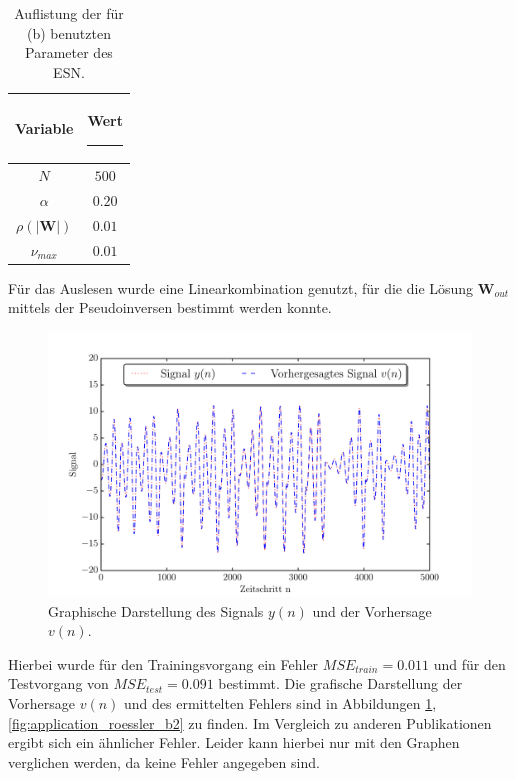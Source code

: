\begin{table}[H]
	\centering
		\begin{tabular}{|c|c|}
		\rule[-1ex]{0pt}{3.5ex} Variable & \hspace{4ex} Wert \rule[-1ex]{4ex}{0pt}\\ 
		\hline \hline 
		\rule[-1ex]{0pt}{3.5ex} $N$ & $500$ \\ 
		\hline 
		\rule[-1ex]{0pt}{3.5ex} $\alpha$ & $0.20$ \\ 
		\hline 
		\rule[-1ex]{0pt}{3.5ex} $\rho(|\mathbf{W}|)$ & $0.01$ \\
		\hline 
		\rule[-1ex]{0pt}{3.5ex} $\nu_{max}$ & $0.01$ \\ 
		\hline 
	\end{tabular} 
	\caption{Auflistung der für (b) benutzten Parameter des \textsc{ESN}.}
\label{tab:application_roessler_b}
\end{table}

Für das Auslesen wurde eine Linearkombination genutzt, für die die Lösung $\mathbf{W}_{out}$ mittels der Pseudoinversen bestimmt werden konnte.

\begin{figure}[H]
    \centering
     \includegraphics[width = 0.9 \textwidth]{figures/roessler_cross_pred.pdf}
    \caption{Graphische Darstellung des Signals $y(n)$ und der Vorhersage $v(n)$.}
    \label{fig:application_roessler_b1}
\end{figure}

Hierbei wurde für den Trainingsvorgang ein Fehler $MSE_{train} = 0.011$ und für den Testvorgang von $MSE_{test} = 0.091$ bestimmt. Die grafische Darstellung der Vorhersage $v(n)$ und des ermittelten Fehlers sind in Abbildungen \ref{fig:application_roessler_b1}, \ref{fig:application_roessler_b2} zu finden. Im Vergleich zu anderen Publikationen \cite{parlitz2005} ergibt sich ein ähnlicher Fehler. Leider kann hierbei nur mit den Graphen verglichen werden, da keine Fehler angegeben sind.

